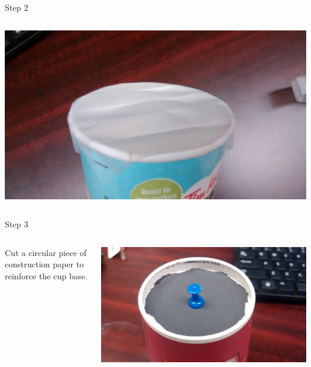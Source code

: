 \begin{frame}{Step 2}
\begin{columns}
\begin{column}{0.4\textwidth}
      \includegraphics[width=\textwidth,trim=4in 0 4in 0,clip]{media/coveredlid1.jpg}
    \end{column}
  \end{columns}
\end{frame}

\begin{frame}{Step 3}
  \begin{columns}
    \begin{column}{0.6\textwidth}
      Cut a circular piece of construction paper to reinforce the cup base.
    \end{column}
    \begin{column}{0.4\textwidth}
      \includegraphics[width=\textwidth]{media/pushpin.jpg}
    \end{column}
  \end{columns}
  
\end{frame}

